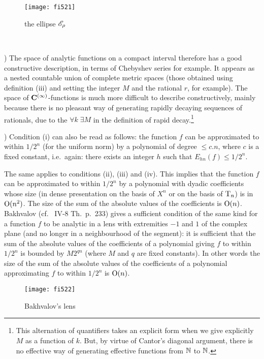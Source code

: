 \begin{figure}[htbp] 
\begin{center}
\texttt{[image: fi521]}
\end{center}
\caption[The ellipse $\sE_\rho$]{\label{fi521} 
the ellipse $\sE_\rho$} 
\end{figure} 

\begin{remarks}\label{rem-anal}~

) The space of analytic functions on a compact interval therefore has a good constructive description, in terms of Chebyshev series for example. It appears as a nested countable union of complete metric spaces (those obtained using definition (iii) and setting the integer $M$ and the rational $r$, for example). 
The space of ${\bf C}^{(\infty)}$-functions is much more difficult to describe constructively, mainly because there is no pleasant way of generating rapidly decaying sequences of rationals, due to the $\forall k\; \exists M$ in the definition of rapid decay.\footnote{This alternation of quantifiers takes an explicit form when we give explicitly $M$ as a function of $k$. But, by virtue of Cantor's diagonal argument, there is no effective way of generating effective functions from $\mathbb {N}$ to $\mathbb {N}$.} 

) Condition (i) can also be read as follows: the function $f$ can be approximated to within $1/2^n$ (for the uniform norm) by a polynomial of degree $\leq c.n$, where $c$ is a fixed constant, i.e.\ again: there exists an integer $h$ such that
$E_{hn}(f) \leq 1/2^n$. 

\noindent 
 The same applies to conditions (ii), (iii) and (iv). This implies that the function $f$ can be approximated to within $1/2^n$ by a polynomial with dyadic coefficients whose size (in dense presentation on the basis of $X^n$ or on the basis of ${\rm T}_n$) is in ${\rm O}(n^2)$. The size of the sum of the absolute values of the coefficients is ${\rm O}(n)$. 
Bakhvalov (cf.\ \cite {Ba} IV-8 Th.\ p.\ 233) gives a sufficient condition of the same kind for a function $f$ to be analytic in a lens with extremities $-1$ and $1$ of the complex plane (and no longer in a neighbourhood of the segment): it is sufficient that the sum of the absolute values of the coefficients of a polynomial giving $f$ to within $1/2^n$ is bounded by $M2^{qn}$ (where $M$ and $q$ are fixed constants). In other words
the size of the sum of the absolute values of the coefficients of a polynomial approximating $f$ to within $1/2^n$ is ${\rm O}(n)$.
\begin{figure}[htbp] 
\begin{center}
\texttt{[image: fi522]}
\end{center}
\caption[Bakhvalov's lens]{\label{fi522} 
Bakhvalov's lens} 
\end{figure} 
\end{remarks}



